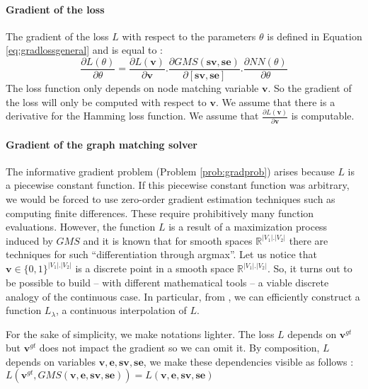 \documentclass[times,onecolumn,final,authoryear]{article}
\theoremstyle{definition}
\begin{document}
\paragraph{Gradient of the loss}
The gradient of the loss $L$ with respect to the parameters $\theta$ is defined in Equation \eqref{eq:gradlossgeneral} and is equal to :
\begin{equation*}
\frac{\partial L(\theta)}{\partial \theta} =  \frac{\partial L(\mathbf{ {v} })}{\partial \mathbf{ {v} } } . \frac{\partial GMS( \mathbf{sv}, \mathbf{se})}{\partial  [\mathbf{sv}, \mathbf{se}] } . \frac{\partial NN(\theta)}{\partial \theta }
\end{equation*}
The loss function only depends on node matching variable $\textbf{v}$. So the gradient of the loss will only be computed with respect to $\mathbf{{v}}$. We assume that there is a derivative for the Hamming loss function. We assume that $\frac{\partial L(\mathbf{{v}})}{\partial \mathbf{{v}}}$ is computable.


\paragraph{Gradient of the graph matching solver}

The informative gradient problem (Problem \ref{prob:gradprob}) arises because $L$ is a piecewise constant function. If this piecewise constant function was arbitrary, we would be forced to use zero-order gradient estimation techniques such as computing finite differences. These require prohibitively many function evaluations.
However, the function $L$ is a result of a maximization process induced by $GMS$ and it is known that for smooth spaces $\mathbb{R}^{|V_1|.|V_2|}$ there are techniques for such “differentiation through argmax”. Let us notice that $\mathbf{v} \in \{0,1\}^{|V_1|.|V_2|}$  is a discrete point in a smooth space $\mathbb{R}^{|V_1|.|V_2|}$. So, it turns out to be possible to build – with different mathematical tools – a viable discrete analogy of the continuous case. In particular, from \cite{DBLP:journals/corr/abs-1912-02175}, we can efficiently construct a function $L_\lambda$, a continuous interpolation of $L$.

For the sake of simplicity, we make notations lighter. The loss $L$ depends on $\mathbf{v}^{gt}$ but $\mathbf{v}^{gt}$ does not impact the gradient so we can omit it. By composition, $L$ depends on variables  $\textbf{v},\textbf{e},\textbf{sv},\textbf{se}$, we make these dependencies visible as follows : 
$L(\mathbf{v}^{gt},GMS(\textbf{v},\textbf{e},\textbf{sv},\textbf{se}))=L(\textbf{v},\textbf{e},\textbf{sv},\textbf{se})$
\end{document}
